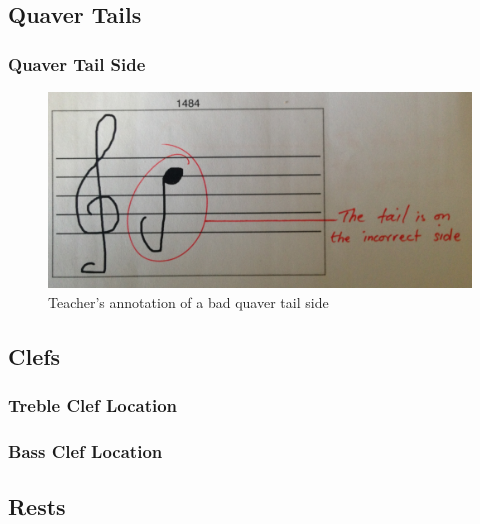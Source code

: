 \subsection{Quaver Tails}

\subsubsection{Quaver Tail Side}\label{sec:tf-quaver-tail-side}

\begin{figure}[H]
  \includegraphics[width=\linewidth]{gfx/photos/teacher-bad-quavertail-side.jpg}
  \caption{Teacher's annotation of a bad quaver tail side}
  \label{fig:teacher-example-quaver-wrong-side}
\end{figure}

\subsection{Clefs}

\subsubsection{Treble Clef Location}\label{sec:tf-treble-clef-location}

\subsubsection{Bass Clef Location}\label{sec:tf-bass-clef-location}

\subsection{Rests}

